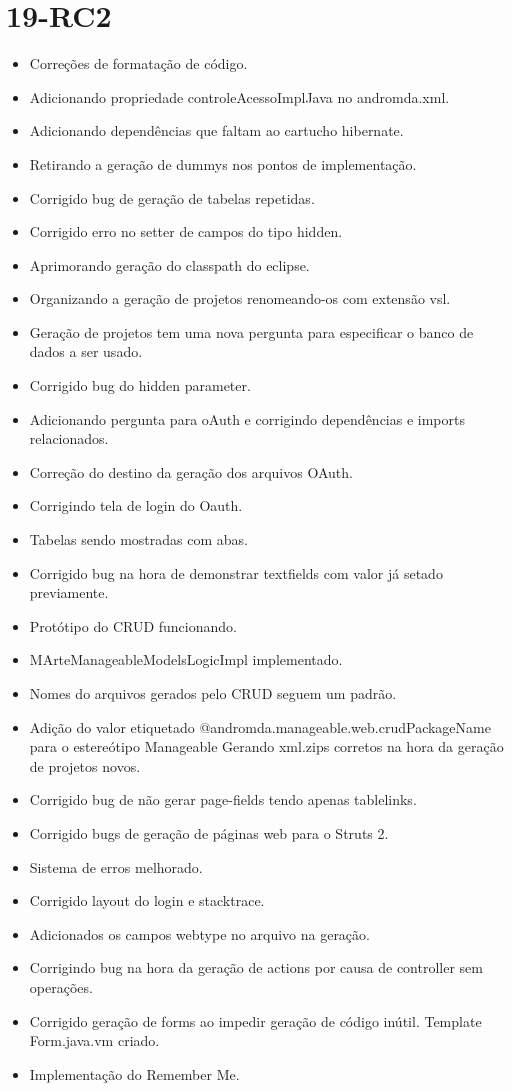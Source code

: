\section{19-RC2}

\begin{itemize}
  \item Correções de formatação de código.
  \item Adicionando propriedade controleAcessoImplJava no andromda.xml.
  \item Adicionando dependências que faltam ao cartucho hibernate.
  \item Retirando a geração de dummys nos pontos de implementação.
  \item Corrigido bug de geração de tabelas repetidas.
  \item Corrigido erro no setter de campos do tipo hidden.
  \item Aprimorando geração do classpath do eclipse.
  \item Organizando a geração de projetos renomeando-os com extensão vsl.
  \item Geração de projetos tem uma nova pergunta para especificar o banco de
dados a ser usado.
  \item Corrigido bug do hidden parameter.
  \item Adicionando pergunta para oAuth e corrigindo dependências e imports
relacionados.
  \item Correção do destino da geração dos arquivos OAuth.
  \item Corrigindo tela de login do Oauth.
  \item Tabelas sendo mostradas com abas.
  \item Corrigido bug na hora de demonstrar textfields com valor já setado
previamente.
  \item Protótipo do CRUD funcionando.
  \item MArteManageableModelsLogicImpl implementado.
  \item Nomes do arquivos gerados pelo CRUD seguem um padrão.
  \item Adição do valor etiquetado @andromda.manageable.web.crudPackageName para
o estereótipo Manageable Gerando xml.zips corretos na hora da geração de projetos novos.
  \item Corrigido bug de não gerar page-fields tendo apenas tablelinks.
  \item Corrigido bugs de geração de páginas web para o Struts 2.
  \item Sistema de erros melhorado.
  \item Corrigido layout do login e stacktrace.
  \item Adicionados os campos webtype no arquivo na geração.
  \item Corrigindo bug na hora da geração de actions por causa de controller sem
operações.
  \item Corrigido geração de forms ao impedir geração de código inútil. Template
Form.java.vm criado.
  \item Implementação do Remember Me.
\end{itemize}

